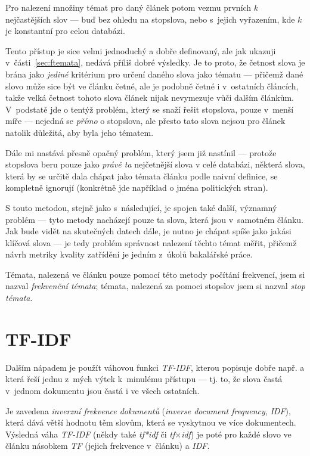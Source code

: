\documentclass[12pt,a4paper]{report}
\begin{document}
Pro nalezení množiny témat pro daný článek potom vezmu prvních $k$ nej\-ča\-s\-tě\-j\-ších slov --- buď bez ohledu na stopslova, nebo s~jejich vyřazením, kde $k$ je konstantní pro celou databázi.

Tento přístup je sice velmi jednoduchý a dobře definovaný, ale jak ukazuji v~části~\ref{sec:ftemata}, nedává příliš dobré výsledky. Je to proto, že četnost slova je brána jako \emph{jediné} kritérium pro určení daného slova jako tématu --- přičemž dané slovo může sice být ve článku četné, ale je podobně četné i v~ostatních článcích, takže velká četnost tohoto slova článek nijak nevymezuje vůči dalším článkům. V~podstatě jde o tentýž problém, který se snaží řešit stopslova, pouze v~menší míře --- nejedná se \emph{přímo} o stopslova, ale přesto tato slova nejsou pro článek natolik důležitá, aby byla jeho tématem.

Dále mi nastává přesně opačný problém, který jsem již nastínil --- protože stopslova beru pouze jako \emph{právě ta} nejčetnější slova v celé databázi, některá slova, která by se určitě dala chápat jako témata článku podle naivní definice, se kompletně ignorují (konkrétně jde například o jména politických stran).

S touto metodou, stejně jako s~následující, je spojen také další, významný problém --- tyto metody nacházejí pouze ta slova, která jsou v~samotném článku. Jak bude vidět na skutečných datech dále, je nutno je chápat spíše jako jakási klíčová slova --- je tedy problém správnost nalezení těchto témat měřit, přičemž návrh metriky kvality zatřídění je jedním z~úkolů bakalářské práce.

Témata, nalezená ve článku pouze pomocí této metody počítání frekvencí, jsem si nazval \emph{frekvenční témata}; témata, nalezená za pomoci stopslov jsem si nazval \emph{stop témata}.

\section{TF-IDF}
\label{sec:tfidf_teory}
Dalším nápadem je použít váhovou funkci \emph{TF-IDF}, kterou popisuje dobře např. \cite{approaches} a která řeší jednu z~mých výtek k~minulému přístupu --- tj. to, že slova častá v~jednom dokumentu jsou častá i ve všech ostatních.

Je zavedena \emph{inverzní frekvence dokumentů} (\emph{inverse document frequency}, \emph{IDF}), která dává větší hodnotu těm slovům, která se vyskytnou ve více dokumentech. Výsledná váha \emph{TF-IDF} (někdy také \emph{tf*idf} či \emph{tf$\times$idf}) je poté pro každé slovo ve článku násobkem \emph{TF} (jejich  frekvence v~článku) a \emph{IDF}.
\end{document}

